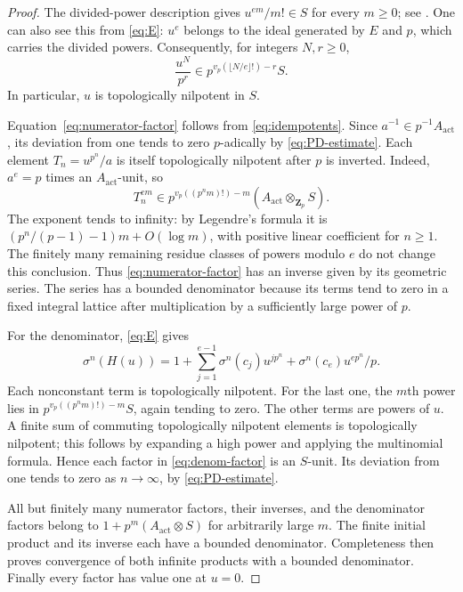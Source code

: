 \documentclass[11pt]{article}
\theoremstyle{definition}\newtheorem{definition}[theorem]{Definition}
\theoremstyle{remark}\newtheorem{remark}[theorem]{Remark}
\newcommand{\ZZ}{\mathbf Z}
\newcommand{\act}{\mathrm{act}}
\begin{document}
\begin{proof}
The divided-power description gives $u^{em}/m!\in S$ for every $m\ge0$; see \citet[Remark~7.11, p.~2254]{Lau}. One can also see this from \eqref{eq:E}: $u^e$ belongs to the ideal generated by $E$ and $p$, which carries the divided powers. Consequently, for integers $N,r\ge0$,
\begin{equation}\label{eq:PD-estimate}
 \frac{u^N}{p^r}\in
 p^{v_p(\lfloor N/e\rfloor!)-r}S.
\end{equation}
In particular, $u$ is topologically nilpotent in $S$.

Equation~\eqref{eq:numerator-factor} follows from \eqref{eq:idempotents}. Since $a^{-1}\in p^{-1}A_{\act}$, its deviation from one tends to zero $p$-adically by \eqref{eq:PD-estimate}. Each element $T_n=u^{p^n}/a$ is itself topologically nilpotent after $p$ is inverted. Indeed, $a^e=p$ times an $A_{\act}$-unit, so
\begin{equation}\label{eq:T-powers}
 T_n^{em}\in
 p^{v_p((p^nm)!)-m}(A_{\act}\otimes_{\ZZ_p}S).
\end{equation}
The exponent tends to infinity: by Legendre's formula it is
$(p^n/(p-1)-1)m+O(\log m)$, with positive linear coefficient for $n\ge1$. The finitely many remaining residue classes of powers modulo $e$ do not change this conclusion. Thus \eqref{eq:numerator-factor} has an inverse given by its geometric series. The series has a bounded denominator because its terms tend to zero in a fixed integral lattice after multiplication by a sufficiently large power of $p$.

For the denominator, \eqref{eq:E} gives
\begin{equation}\label{eq:denom-factor}
 \sigma^n(H(u))
 =1+\sum_{j=1}^{e-1}\sigma^n(c_j)u^{jp^n}
    +\sigma^n(c_e)u^{ep^n}/p.
\end{equation}
Each nonconstant term is topologically nilpotent. For the last one, the $m$th power lies in
$p^{v_p((p^nm)!)-m}S$, again tending to zero. The other terms are powers of $u$. A finite sum of commuting topologically nilpotent elements is topologically nilpotent; this follows by expanding a high power and applying the multinomial formula. Hence each factor in \eqref{eq:denom-factor} is an $S$-unit. Its deviation from one tends to zero as $n\to\infty$, by \eqref{eq:PD-estimate}.

All but finitely many numerator factors, their inverses, and the denominator factors belong to $1+p^m(A_{\act}\otimes S)$ for arbitrarily large $m$. The finite initial product and its inverse each have a bounded denominator. Completeness then proves convergence of both infinite products with a bounded denominator. Finally every factor has value one at $u=0$.
\end{proof}
\end{document}
